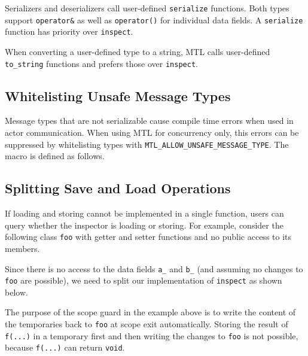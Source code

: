 Serializers and deserializers call user-defined \lstinline^serialize^
functions. Both types support \lstinline^operator&^ as well as
\lstinline^operator()^ for individual data fields. A \lstinline^serialize^
function has priority over \lstinline^inspect^.

When converting a user-defined type to a string, MTL calls user-defined
\lstinline^to_string^ functions and prefers those over \lstinline^inspect^.

\subsection{Whitelisting Unsafe Message Types}
\label{unsafe-message-type}

Message types that are not serializable cause compile time errors when used in
actor communication. When using MTL for concurrency only, this errors can be
suppressed by whitelisting types with
\lstinline^MTL_ALLOW_UNSAFE_MESSAGE_TYPE^. The macro is defined as follows.


\clearpage
\subsection{Splitting Save and Load Operations}

If loading and storing cannot be implemented in a single function, users can
query whether the inspector is loading or storing. For example, consider the
following class \lstinline^foo^ with getter and setter functions and no public
access to its members.


\clearpage
Since there is no access to the data fields \lstinline^a_^ and \lstinline^b_^
(and assuming no changes to \lstinline^foo^ are possible), we need to split our
implementation of \lstinline^inspect^ as shown below.


The purpose of the scope guard in the example above is to write the content of
the temporaries back to \lstinline^foo^ at scope exit automatically. Storing
the result of \lstinline^f(...)^ in a temporary first and then writing the
changes to \lstinline^foo^ is not possible, because \lstinline^f(...)^ can
return \lstinline^void^.
